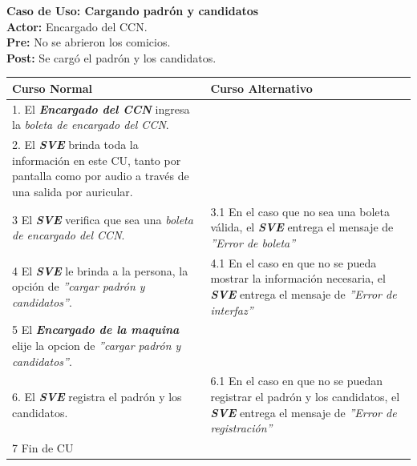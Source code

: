 \documentclass[spanish, 10pt,a4paper]{article}
\numberwithin{equation}{section} %
\begin{document}
\newpage
\noindent\textbf{Caso de Uso: Cargando padrón y candidatos}\\
\textbf{Actor: } Encargado del CCN.\\
\textbf{Pre: } No se abrieron los comicios.\\
\textbf{Post: } Se cargó el padrón y los candidatos.\\
\begin{table}[H]
  \centering
\bgroup
\def\arraystretch{1.3}
  \begin{tabular}{p{9cm} | p{7cm}}
    \hline
    Curso Normal & Curso Alternativo \\
    \hline
    \hline    
    1. El \textbf{\textit{Encargado del CCN}} ingresa la \textit{boleta de encargado del CCN}. 
    & \\
    
    \hline
    2. El \textbf{\textit{SVE}} brinda toda la información en este CU, tanto por pantalla como por audio a través de una salida por auricular.
    &
    \\
    
    \hline
    3 El \textbf{\textit{SVE}} verifica que sea una \textit{boleta de encargado del CCN}.
    & 
    3.1 En el caso que no sea una boleta válida, el \textbf{\textit{SVE}} entrega el mensaje de \textit{''Error de boleta''}
    \\
    
    \hline
    4 El \textbf{\textit{SVE}} le brinda a la persona, la opción de \textit{''cargar padrón y candidatos''}.
    & 
    4.1 En el caso en que no se pueda mostrar la información necesaria, el \textbf{\textit{SVE}} entrega el mensaje de \textit{''Error de interfaz''}
    \\
    
    \hline
    5 El \textbf{\textit{Encargado de la maquina}} elije la opcion de \textit{''cargar padrón y candidatos''}.
    & \\
    
    \hline
    6. El \textbf{\textit{SVE}} registra el padrón y los candidatos.
    &
    6.1 En el caso en que no se puedan registrar el padrón y los candidatos, el \textbf{\textit{SVE}} entrega el mensaje de \textit{''Error de registración''}
    \\
    
    \hline
    7 Fin de CU
    & \\
    \hline
  \end{tabular}
\egroup
\end{table}


\newpage
\end{document}
